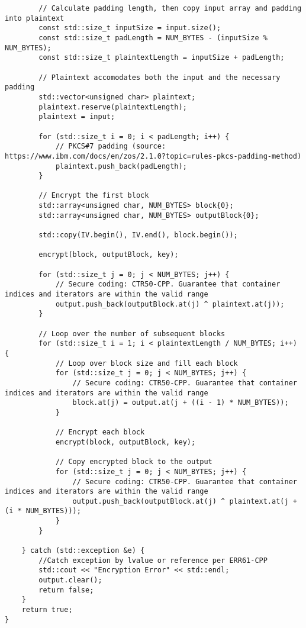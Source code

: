 \documentclass[a4paper,12pt]{article}
\begin{document}
{\begin{lstlisting}
        // Calculate padding length, then copy input array and padding into plaintext
        const std::size_t inputSize = input.size();
        const std::size_t padLength = NUM_BYTES - (inputSize % NUM_BYTES);
        const std::size_t plaintextLength = inputSize + padLength;

        // Plaintext accomodates both the input and the necessary padding
        std::vector<unsigned char> plaintext;
        plaintext.reserve(plaintextLength);
        plaintext = input;

        for (std::size_t i = 0; i < padLength; i++) {
            // PKCS#7 padding (source: https://www.ibm.com/docs/en/zos/2.1.0?topic=rules-pkcs-padding-method)
            plaintext.push_back(padLength);
        }

        // Encrypt the first block
        std::array<unsigned char, NUM_BYTES> block{0};
        std::array<unsigned char, NUM_BYTES> outputBlock{0};

        std::copy(IV.begin(), IV.end(), block.begin());

        encrypt(block, outputBlock, key);

        for (std::size_t j = 0; j < NUM_BYTES; j++) {
            // Secure coding: CTR50-CPP. Guarantee that container indices and iterators are within the valid range
            output.push_back(outputBlock.at(j) ^ plaintext.at(j));
        }

        // Loop over the number of subsequent blocks
        for (std::size_t i = 1; i < plaintextLength / NUM_BYTES; i++) {
            // Loop over block size and fill each block
            for (std::size_t j = 0; j < NUM_BYTES; j++) {
                // Secure coding: CTR50-CPP. Guarantee that container indices and iterators are within the valid range
                block.at(j) = output.at(j + ((i - 1) * NUM_BYTES));
            }

            // Encrypt each block
            encrypt(block, outputBlock, key);

            // Copy encrypted block to the output
            for (std::size_t j = 0; j < NUM_BYTES; j++) {
                // Secure coding: CTR50-CPP. Guarantee that container indices and iterators are within the valid range
                output.push_back(outputBlock.at(j) ^ plaintext.at(j + (i * NUM_BYTES)));
            }
        }

    } catch (std::exception &e) {
        //Catch exception by lvalue or reference per ERR61-CPP
        std::cout << "Encryption Error" << std::endl;
        output.clear();
        return false;
    }
    return true;
}


\end{lstlisting}}
\end{document}
